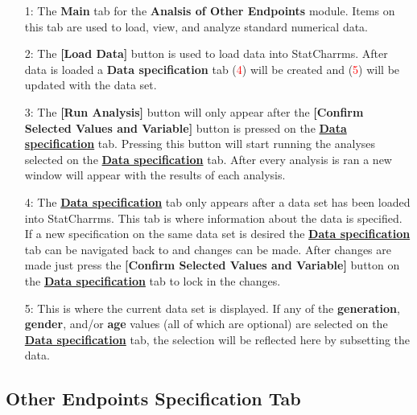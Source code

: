 \documentclass[a4paper]{article}
\begin{document}
	\begin{enumerate}
		\item[\begingroup\color{red}1:\endgroup] The \textbf{Main} tab for the \textbf{Analsis of Other Endpoints}
			module.  Items on this tab are used to load, view, and analyze standard numerical data.
			
		\item[\begingroup\color{red}2:\endgroup] The \textbf{[Load Data]} button is used to load data into 
			StatCharrms. After data is loaded a \textbf{Data specification} tab (\textcolor{red}{4}) will be 
			created and (\textcolor{red}{5}) will be updated with the data set.
			
		\item[\begingroup\color{red}3:\endgroup] The \textbf{[Run Analysis]} button will only appear after the 
			\textbf{[Confirm Selected Values and Variable]} button is pressed on the \hyperlink{fig:DataSpecTab}{\textbf{Data specification}} tab.
			Pressing this button will start running the analyses selected on the \hyperlink{fig:DataSpecTab}{\textbf{Data specification}} tab.
			After every analysis is ran a new window will appear with the results of each analysis.
			
		\item[\begingroup\color{red}4:\endgroup] The \hyperlink{fig:DataSpecTab}{\textbf{Data specification}} tab 
			only appears after a data set has been loaded into StatCharrms.  This tab is where information about 
			the data is specified. If a new specification on the same data set is desired the 
			\hyperlink{fig:DataSpecTab}{\textbf{Data specification}} tab can be navigated back to and changes 
 			can be made.
			After changes are made just press the \textbf{[Confirm Selected Values and Variable]} button on the 
			\hyperlink{fig:DataSpecTab}{\textbf{Data specification}} tab to lock in the changes.  
			
		\item[\begingroup\color{red}5:\endgroup] This is where the current data set is displayed.  If any of the 
			\textbf{generation}, \textbf{gender}, and/or \textbf{age} values (all of which are optional) are selected on the \hyperlink{fig:DataSpecTab}{\textbf{Data specification}} tab,
			the selection will be reflected here by subsetting the data. 
			
	\end{enumerate}	
	
\label{subsec:OtherEndpointsSpec}
\subsection*{Other Endpoints Specification Tab}
	
\end{document}
